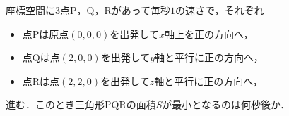 \documentclass[../../main.tex]{subfiles}
\begin{document}
座標空間に$3$点$\mathrm{P}$，$\mathrm{Q}$，$\mathrm{R}$があって毎秒$1$の速さで，それぞれ
\begin{itemize}
  \item 点$\mathrm{P}$は原点$(0,0,0)$を出発して$x$軸上を正の方向へ，
  \item 点$\mathrm{Q}$は点$(2,0,0)$を出発して$y$軸と平行に正の方向へ，
  \item 点$\mathrm{R}$は点$(2,2,0)$を出発して$z$軸と平行に正の方向へ，
\end{itemize}
進む．このとき三角形$\mathrm{PQR}$の面積$S$が最小となるのは何秒後か．
\end{document}

